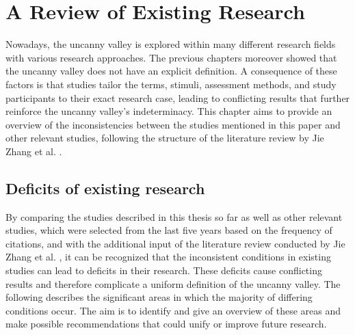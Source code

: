 \chapter{A Review of Existing Research}
\label{chap:5}
Nowadays, the uncanny valley is explored within many different research fields with various research approaches. The previous chapters moreover showed that the uncanny valley does not have an explicit definition. A consequence of these factors is that studies tailor the terms, stimuli, assessment methods, and study participants to their exact research case, leading to conflicting results that further reinforce the uncanny valley's indeterminacy.
This chapter aims to provide an overview of the inconsistencies between the studies mentioned in this paper and other relevant studies, following the structure of the literature review by Jie Zhang et al. \cite{quant_review}.

 \section{Deficits of existing research}
 By comparing the studies described in this thesis so far as well as other relevant studies, which were selected from the last five years based on the frequency of citations, and with the additional input of the literature review conducted by Jie Zhang et al. \cite{quant_review}, it can be recognized that the inconsistent conditions in existing studies can lead to deficits in their research. These deficits cause conflicting results and therefore complicate a uniform definition of the uncanny valley. The following describes the significant areas in which the majority of differing conditions occur. The aim is to identify and give an overview of these areas and make possible recommendations that could unify or improve future research. 

